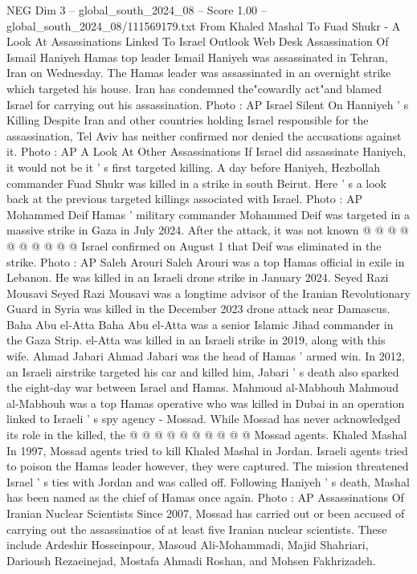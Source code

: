 \begin{textsample}{NEG Dim 3 – global\_south\_2024\_08 – Score 1.00 – global\_south\_2024\_08/111569179.txt}  \label{ex:f3_neg_125}
From Khaled Mashal To Fuad Shukr - A Look At Assassinations Linked To Israel Outlook Web Desk Assassination Of Ismail Haniyeh Hamas top leader Ismail Haniyeh was assassinated in Tehran, Iran on Wednesday.
The Hamas leader was assassinated in an overnight strike which targeted his house.
Iran has condemned the"cowardly act"and blamed Israel for carrying out his assassination.
Photo : AP Israel Silent On Hanniyeh ' s Killing Despite Iran and other countries holding Israel responsible for the assassination, Tel Aviv has neither confirmed nor denied the accusations against it.
Photo : AP A Look At Other Assassinations If Israel did assassinate Haniyeh, it would not be it ' s first targeted killing.
A day before Haniyeh, Hezbollah commander Fuad Shukr was killed in a strike in south Beirut.
Here ' s a look back at the previous targeted killings associated with Israel.
Photo : AP Mohammed Deif Hamas ' military commander Mohammed Deif was targeted in a massive strike in Gaza in July 2024.
After the attack, it was not known @ @ @ @ @ @ @ @ @ @ Israel confirmed on August 1 that Deif was eliminated in the strike.
Photo : AP Saleh Arouri Saleh Arouri was a top Hamas official in exile in Lebanon.
He was killed in an Israeli drone strike in January 2024.
Seyed Razi Mousavi Seyed Razi Mousavi was a longtime advisor of the Iranian Revolutionary Guard in Syria was killed in the December 2023 drone attack near Damascus.
Baha Abu el-Atta Baha Abu el-Atta was a senior Islamic Jihad commander in the Gaza Strip. el-Atta was killed in an Israeli strike in 2019, along with this wife.
Ahmad Jabari Ahmad Jabari was the head of Hamas ' armed win.
In 2012, an Israeli airstrike targeted his car and killed him, Jabari ' s death also sparked the eight-day war between Israel and Hamas.
Mahmoud al-Mabhouh Mahmoud al-Mabhouh was a top Hamas operative who was killed in Dubai in an operation linked to Israeli ' s spy agency - Mossad.
While Mossad has never acknowledged its role in the killed, the @ @ @ @ @ @ @ @ @ @ Mossad agents.
Khaled Mashal In 1997, Mossad agents tried to kill Khaled Mashal in Jordan.
Israeli agents tried to poison the Hamas leader however, they were captured.
The mission threatened Israel ' s ties with Jordan and was called off.
Following Haniyeh ' s death, Mashal has been named as the chief of Hamas once again.
Photo : AP Assassinations Of Iranian Nuclear Scientists Since 2007, Mossad has carried out or been accused of carrying out the assassinatios of at least five Iranian nuclear scientists.
These include Ardeshir Hosseinpour, Masoud Ali-Mohammadi, Majid Shahriari, Darioush Rezaeinejad, Mostafa Ahmadi Roshan, and Mohsen Fakhrizadeh.

\end{textsample}
